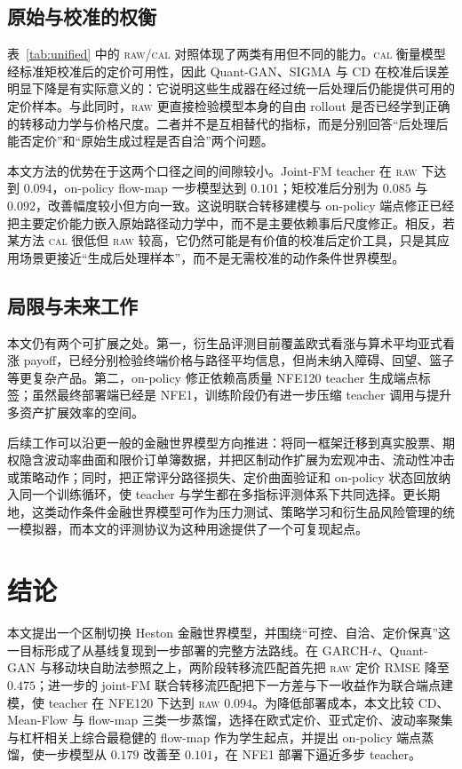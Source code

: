 \documentclass[11pt]{ctexart}
\newcommand{\raw}{\textsc{raw}}
\renewcommand{\cal}{\textsc{cal}}
\begin{document}
\subsection{原始与校准的权衡}
\label{sec:tradeoff}
表~\ref{tab:unified} 中的 \raw{}/\cal{} 对照体现了两类有用但不同的能力。\cal{} 衡量模型经标准矩校准后的定价可用性，因此 Quant-GAN、SIGMA 与 CD 在校准后误差明显下降是有实际意义的：它说明这些生成器在经过统一后处理后仍能提供可用的定价样本。与此同时，\raw{} 更直接检验模型本身的自由 rollout 是否已经学到正确的转移动力学与价格尺度。二者并不是互相替代的指标，而是分别回答“后处理后能否定价”和“原始生成过程是否自洽”两个问题。

本文方法的优势在于这两个口径之间的间隙较小。Joint-FM teacher 在 \raw{} 下达到 $0.094$，on-policy flow-map 一步模型达到 $0.101$；矩校准后分别为 $0.085$ 与 $0.092$，改善幅度较小但方向一致。这说明联合转移建模与 on-policy 端点修正已经把主要定价能力嵌入原始路径动力学中，而不是主要依赖事后尺度修正。相反，若某方法 \cal{} 很低但 \raw{} 较高，它仍然可能是有价值的校准后定价工具，只是其应用场景更接近“生成后处理样本”，而不是无需校准的动作条件世界模型。

\subsection{局限与未来工作}
本文仍有两个可扩展之处。第一，衍生品评测目前覆盖欧式看涨与算术平均亚式看涨 payoff，已经分别检验终端价格与路径平均信息，但尚未纳入障碍、回望、篮子等更复杂产品。第二，on-policy 修正依赖高质量 NFE120 teacher 生成端点标签；虽然最终部署端已经是 NFE1，训练阶段仍有进一步压缩 teacher 调用与提升多资产扩展效率的空间。

后续工作可以沿更一般的金融世界模型方向推进：将同一框架迁移到真实股票、期权隐含波动率曲面和限价订单簿数据，并把区制动作扩展为宏观冲击、流动性冲击或策略动作；同时，把正常评分路径损失、定价曲面验证和 on-policy 状态回放纳入同一个训练循环，使 teacher 与学生都在多指标评测体系下共同选择。更长期地，这类动作条件金融世界模型可作为压力测试、策略学习和衍生品风险管理的统一模拟器，而本文的评测协议为这种用途提供了一个可复现起点。

\section{结论}
\label{sec:conclusion}

本文提出一个区制切换 Heston 金融世界模型，并围绕“可控、自洽、定价保真”这一目标形成了从基线复现到一步部署的完整方法路线。在 GARCH-$t$、Quant-GAN 与移动块自助法参照之上，两阶段转移流匹配首先把 \raw{} 定价 RMSE 降至 $0.475$；进一步的 joint-FM 联合转移流匹配把下一方差与下一收益作为联合端点建模，使 teacher 在 NFE120 下达到 \raw{} $0.094$。为降低部署成本，本文比较 CD、Mean-Flow 与 flow-map 三类一步蒸馏，选择在欧式定价、亚式定价、波动率聚集与杠杆相关上综合最稳健的 flow-map 作为学生起点，并提出 on-policy 端点蒸馏，使一步模型从 $0.179$ 改善至 $0.101$，在 NFE1 部署下逼近多步 teacher。
\end{document}
